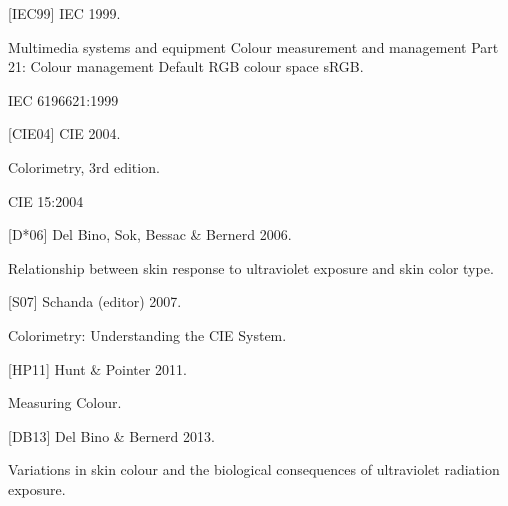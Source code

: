 \documentclass[letterpaper,10pt,english]{sphinxmanual}
\begin{document}
\begin{DUlineblock}{0em}
\item[] {[}IEC99{]} IEC 1999.
\item[] Multimedia systems and equipment \sphinxhyphen{} Colour measurement and management \sphinxhyphen{} Part 2\sphinxhyphen{}1: Colour management \sphinxhyphen{} Default RGB colour space \sphinxhyphen{} sRGB.
\item[] IEC 61966\sphinxhyphen{}2\sphinxhyphen{}1:1999
\end{DUlineblock}

\begin{DUlineblock}{0em}
\item[] {[}CIE04{]} CIE 2004.
\item[] Colorimetry, 3rd edition.
\item[] CIE 15:2004
\end{DUlineblock}

\begin{DUlineblock}{0em}
\item[] {[}D*06{]} Del Bino, Sok, Bessac \& Bernerd 2006.
\item[] Relationship between skin response to ultraviolet exposure and skin color type.
\item[] 
\end{DUlineblock}

\begin{DUlineblock}{0em}
\item[] {[}S07{]} Schanda (editor) 2007.
\item[] Colorimetry: Understanding the CIE System.
\item[] 
\end{DUlineblock}

\begin{DUlineblock}{0em}
\item[] {[}HP11{]} Hunt \& Pointer 2011.
\item[] Measuring Colour.
\item[] 
\end{DUlineblock}

\begin{DUlineblock}{0em}
\item[] {[}DB13{]} Del Bino \& Bernerd 2013.
\item[] Variations in skin colour and the biological consequences of ultraviolet radiation exposure.
\item[] 
\end{DUlineblock}
\end{document}
